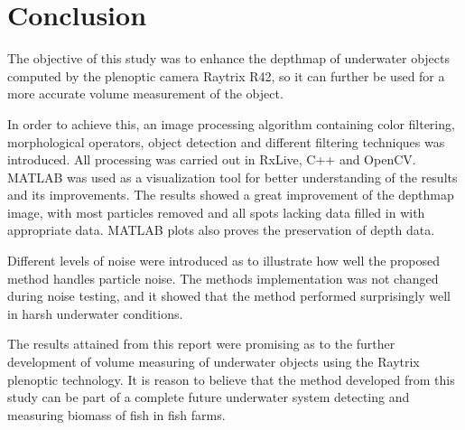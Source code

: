 \section{Conclusion}\label{conclusion}

The objective of this study was to enhance the depthmap of underwater objects computed by the plenoptic camera Raytrix R42, so it can further be used for a more accurate volume measurement of the object. 

In order to achieve this, an image processing algorithm containing color filtering, morphological operators, object detection and different filtering techniques was introduced. All processing was carried out in RxLive, C++ and OpenCV. MATLAB was used as a visualization tool for better understanding of the results and its improvements. The results showed a great improvement of the depthmap image, with most particles removed and all spots lacking data filled in with appropriate data. MATLAB plots also proves the preservation of depth data.

Different levels of noise were introduced as to illustrate how well the proposed method handles particle noise. The methods implementation was not changed during noise testing, and it showed that the method performed surprisingly well in harsh underwater conditions. 

The results attained from this report were promising as to the further development of volume measuring of underwater objects using the Raytrix plenoptic technology. It is reason to believe that the method developed from this study can be part of a complete future underwater system detecting and measuring biomass of fish in fish farms. 



